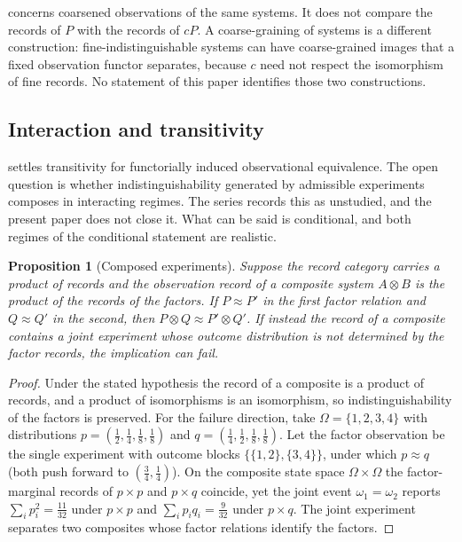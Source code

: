 \documentclass[11pt,letterpaper]{article}
\newtheorem{proposition}[theorem]{Proposition}
\theoremstyle{definition}
\theoremstyle{remark}
\begin{document}
 concerns coarsened observations of the same systems. It does not compare the records of $P$ with the records of $cP$. A coarse-graining of systems is a different construction: fine-indistinguishable systems can have coarse-grained images that a fixed observation functor separates, because $c$ need not respect the isomorphism of fine records. No statement of this paper identifies those two constructions.

\subsection{Interaction and transitivity}

 settles transitivity for functorially induced observational equivalence. The open question is whether indistinguishability generated by admissible experiments composes in interacting regimes. The series records this as unstudied, and the present paper does not close it. What can be said is conditional, and both regimes of the conditional statement are realistic.

\begin{proposition}[Composed experiments]
\label{prop:composed}
Suppose the record category carries a product of records and the observation record of a composite system $A \otimes B$ is the product of the records of the factors. If $P \approx P'$ in the first factor relation and $Q \approx Q'$ in the second, then $P \otimes Q \approx P' \otimes Q'$. If instead the record of a composite contains a joint experiment whose outcome distribution is not determined by the factor records, the implication can fail.
\end{proposition}

\begin{proof}
Under the stated hypothesis the record of a composite is a product of records, and a product of isomorphisms is an isomorphism, so indistinguishability of the factors is preserved. For the failure direction, take $\Omega = \{1,2,3,4\}$ with distributions $p = (\tfrac{1}{2}, \tfrac{1}{4}, \tfrac{1}{8}, \tfrac{1}{8})$ and $q = (\tfrac{1}{4}, \tfrac{1}{2}, \tfrac{1}{8}, \tfrac{1}{8})$. Let the factor observation be the single experiment with outcome blocks $\{\{1,2\}, \{3,4\}\}$, under which $p \approx q$ (both push forward to $(\tfrac{3}{4}, \tfrac{1}{4})$). On the composite state space $\Omega \times \Omega$ the factor-marginal records of $p \times p$ and $p \times q$ coincide, yet the joint event $\omega_1 = \omega_2$ reports $\sum_i p_i^2 = \tfrac{11}{32}$ under $p \times p$ and $\sum_i p_i q_i = \tfrac{9}{32}$ under $p \times q$. The joint experiment separates two composites whose factor relations identify the factors.
\end{proof}
\end{document}
